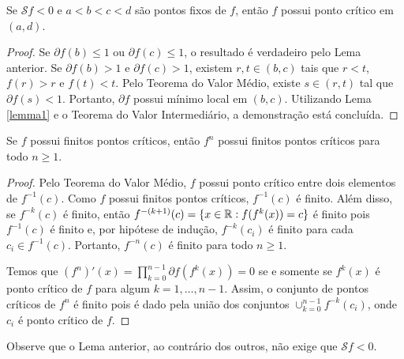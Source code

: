 \begin{lemma}
\label{lemma3}
Se $\mathcal{S}f < 0$ e $a<b<c<d$ são pontos fixos de $f$, então $f$ possui ponto crítico em $(a,d)$.
\end{lemma}

\begin{proof}
Se $\partial f(b) \leq 1$ ou $\partial f(c) \leq 1$, o resultado é verdadeiro pelo Lema anterior. Se $\partial f(b) > 1$ e $\partial f(c) > 1$, existem $r, t \in (b,c)$ tais que $r<t$, $f(r) > r$ e $f(t) < t$. Pelo Teorema do Valor Médio, existe $s \in (r,t)$ tal que $\partial f(s) < 1$. Portanto, $\partial f$ possui mínimo local em $(b,c)$. Utilizando Lema \ref{lemma1} e o Teorema do Valor Intermediário, a demonstração está concluída.
\end{proof}

\begin{lemma}
Se $f$ possui finitos pontos críticos, então $f^n$ possui finitos pontos críticos para todo $n \geq 1$.
\end{lemma}
\begin{proof}

Pelo Teorema do Valor Médio, $f$ possui ponto crítico entre dois elementos de $f^{-1}(c)$. Como $f$ possui finitos pontos críticos, $f^{-1}(c)$ é finito. Além disso, se $f^{-k}(c)$ é finito, então $f^{-(k+1)}(c) = \{ x \in \mathbb{R} : f(f^k(x)) = c \}$ é finito pois $f^{-1}(c)$ é finito e, por hipótese de indução, $f^{-k}(c_ i)$ é finito para cada $c_i \in f^{-1}(c)$. Portanto, $f^{-n}(c)$ é finito para todo $n \geq 1$.

Temos que $(f^n)'(x) = \prod_{k=0}^{n-1} \partial f(f^k(x)) = 0$ se e somente se $f^k(x)$ é ponto crítico de $f$ para algum $k = 1, \dots, n-1$. Assim, o conjunto de pontos críticos de $f^n$ é finito pois é dado pela união dos conjuntos $\cup_{k=0}^{n-1} f^{-k}(c_i)$, onde $c_i$ é ponto crítico de $f$.
\end{proof}

Observe que o Lema anterior, ao contrário dos outros, não exige que $\mathcal{S}f < 0$.
%
%

